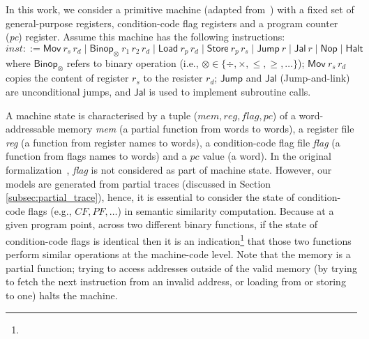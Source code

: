 In this work, we consider a primitive machine (adapted from~\cite{de2015micro}) with a fixed set of general-purpose registers, condition-code flag registers and a program counter (\textit{pc}) register.
Assume this machine has the following instructions:
\begin{equation*}
inst ::= \mathsf{Mov} \: r_s\, r_d\; \vert \; \mathsf{Binop_\otimes} \: r_1\, r_2\, r_d\; \vert \; \mathsf{Load} \: r_p\, r_d\; \vert \; \mathsf{Store} \: r_p\, r_s \; \vert \; \mathsf{Jump} \: r \; \vert \; \mathsf{Jal} \: r \; \vert \; \mathsf{Nop} \; \vert \; \mathsf{Halt}
\end{equation*}
where $\mathsf{Binop_\otimes}$ refers to binary operation (i.e., $\otimes \in \lbrace \div, \times, \leq, \geq, \ldots\rbrace$); $\mathsf{Mov} \: r_s\, r_d$ copies the content of register $r_s$ to the resister $r_d$;  $\mathsf{Jump}$ and $\mathsf{Jal}$ (Jump-and-link) are unconditional jumps, and $\mathsf{Jal}$ is used to implement subroutine calls.

A machine state is characterised by a tuple ($mem, reg, flag, pc$) of a word-addressable memory \textit{mem} (a partial function from words to words), a register file \textit{reg} (a function from register names to words), a condition-code flag file \textit{flag} (a function from flags names to words) and a $pc$ value (a word). In the original formalization~\cite{de2015micro}, \textit{flag} is not considered as part of machine state. However, our models are generated from partial traces (discussed in Section \ref{subsec:partial_trace}), hence, it is essential to consider the state of condition-code flags (e.g., $CF, PF, \ldots$) in semantic similarity computation. Because at a given program point, across two different binary functions, if the state of condition-code flags is identical then it is an indication\footnote{} that those two functions perform similar operations at the machine-code level. Note that the memory is a partial function; trying to access addresses outside of the valid memory (by trying to fetch the next instruction from an invalid address, or loading from or storing to one) halts the machine.

